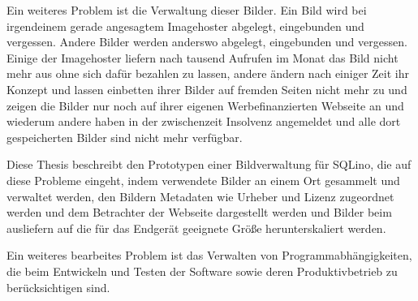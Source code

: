 
Ein weiteres Problem ist die Verwaltung dieser Bilder. Ein Bild wird bei
irgendeinem gerade angesagtem Imagehoster abgelegt, eingebunden und vergessen.
Andere Bilder werden anderswo abgelegt, eingebunden und vergessen. Einige der
Imagehoster liefern nach tausend Aufrufen im Monat das Bild nicht mehr aus ohne
sich dafür bezahlen zu lassen, andere ändern nach einiger Zeit ihr Konzept und
lassen einbetten ihrer Bilder auf fremden Seiten nicht mehr zu und zeigen die
Bilder nur noch auf ihrer eigenen Werbefinanzierten Webseite an und wiederum
andere haben in der zwischenzeit Insolvenz angemeldet und alle dort
gespeicherten Bilder sind nicht mehr verfügbar.

Diese Thesis beschreibt den Prototypen einer Bildverwaltung für SQLino, die auf
diese Probleme eingeht, indem verwendete Bilder an einem Ort gesammelt und
verwaltet werden, den Bildern Metadaten wie Urheber und Lizenz zugeordnet
werden und dem Betrachter der Webseite dargestellt werden und Bilder beim
ausliefern auf die für das Endgerät geeignete Größe herunterskaliert werden.

Ein weiteres bearbeites Problem ist das Verwalten von Programmabhängigkeiten, die beim Entwickeln und Testen der Software sowie deren Produktivbetrieb zu berücksichtigen sind. 

